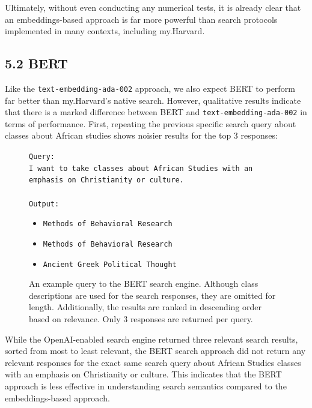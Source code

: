 \documentclass[
	a4paper, %
	10pt, %
	unnumberedsections, %
	twoside, %
]{LTJournalArticle}
\begin{document}
Ultimately, without even conducting any numerical tests, it is already clear that an embeddings-based approach is far more powerful than search protocols implemented in many contexts, including my.Harvard. 

\subsection{5.2 BERT}

Like the \texttt{text-embedding-ada-002} 
approach, we also expect BERT to perform far better than my.Harvard's native search. However, qualitative results indicate that there is a marked difference between BERT and \texttt{text-embedding-ada-002} in terms of performance. First, repeating the previous specific search query about classes about African studies shows noisier results for the top $3$ responses: 

\begin{figure}[h]
	\begin{center}
		\texttt{Query:} \\
		\texttt{I want to take classes about African Studies with an emphasis on Christianity or culture.}\\
		\texttt{}\\
		\texttt{Output:}
	\end{center}
\end{figure}

\begin{figure}
	\begin{center}
		\begin{itemize}
			\item \texttt{Methods of Behavioral Research}
			\item \texttt{Methods of Behavioral Research}
			\item \texttt{Ancient Greek Political Thought}
		\end{itemize}		
	\end{center}

	\caption{An example query to the BERT search engine. Although class descriptions are used for the search responses, they are omitted for length. Additionally, the results are ranked in descending order based on relevance. Only 3 responses are returned per query.}
	\label{fig:ex6}
\end{figure}


While the OpenAI-enabled search engine returned three relevant search results, sorted from most to least relevant, the BERT search approach did not return any relevant responses for the exact same search query about African Studies classes with an emphasis on Christianity or culture. This indicates that the BERT approach is less effective in understanding search semantics compared to the embeddings-based approach. 
\end{document}
